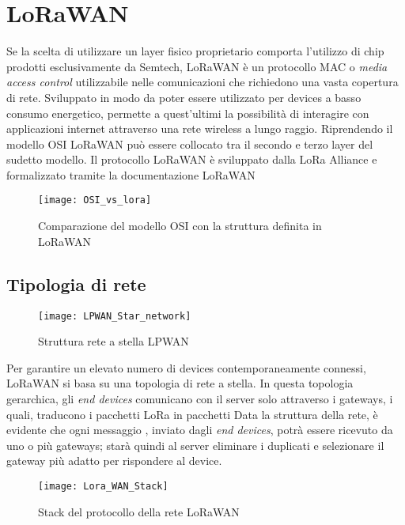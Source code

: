 \section{LoRaWAN}
Se la scelta di utilizzare un layer fisico proprietario comporta l'utilizzo di
chip prodotti esclusivamente da Semtech, 
LoRaWAN è un protocollo MAC o \emph{media access control} utilizzabile nelle
comunicazioni che richiedono una vasta copertura di rete. Sviluppato in modo da
poter essere utilizzato per devices a basso consumo energetico, permette a
quest'ultimi la possibilità di interagire con applicazioni internet attraverso
una rete wireless a lungo raggio.
Riprendendo il modello OSI LoRaWAN può essere collocato tra il secondo e terzo
layer del sudetto modello.
Il protocollo LoRaWAN è sviluppato dalla LoRa Alliance e formalizzato tramite la
documentazione LoRaWAN 

\begin{figure}[h]
\centering 
\texttt{[image: OSI\_vs\_lora]}
\caption{Comparazione del modello OSI con la struttura definita in LoRaWAN}
\label{}
\end{figure}

\subsection{Tipologia di rete}
\begin{figure}[h]
\centering 
\texttt{[image: LPWAN\_Star\_network]}
\caption{Struttura rete a stella LPWAN}
\end{figure}
Per garantire un elevato numero di devices contemporaneamente connessi, LoRaWAN
si basa su una topologia di rete a stella.
In questa topologia gerarchica, gli \emph{end devices} comunicano con il server
solo attraverso i gateways, i quali, traducono i pacchetti LoRa in pacchetti
Data la struttura della rete,  è evidente che ogni
messaggio , inviato dagli \emph{end devices}, potrà essere ricevuto da uno o più
gateways; starà quindi al server eliminare i duplicati e selezionare il gateway
più adatto per rispondere al device.

\begin{figure}[h]
\centering 
\texttt{[image: Lora\_WAN\_Stack]}
\caption{Stack del protocollo della rete LoRaWAN}
\label{fig:stack_lora}
\end{figure}

